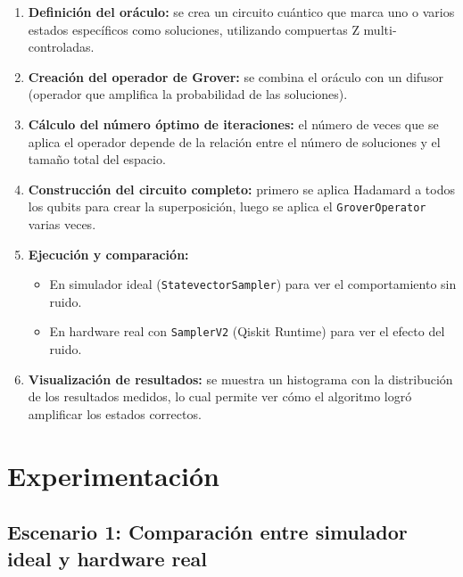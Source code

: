\documentclass{article}
\begin{document}
\begin{enumerate}
    \item \textbf{Definición del oráculo:} se crea un circuito cuántico que marca uno o 
    varios estados específicos como soluciones, utilizando compuertas Z multi-controladas.

    \item \textbf{Creación del operador de Grover:} se combina el oráculo con un difusor 
    (operador que amplifica la probabilidad de las soluciones).

    \item \textbf{Cálculo del número óptimo de iteraciones:} el número de veces que se aplica 
    el operador depende de la relación entre el número de soluciones y el tamaño total del espacio.

    \item \textbf{Construcción del circuito completo:} primero se aplica Hadamard a todos los 
    qubits para crear la superposición, luego se aplica el \texttt{GroverOperator} varias veces.

    \item \textbf{Ejecución y comparación:}
    \begin{itemize}
        \item En simulador ideal (\texttt{StatevectorSampler}) para ver el comportamiento sin ruido.
        \item En hardware real con \texttt{SamplerV2} (Qiskit Runtime) para ver el efecto del ruido.
    \end{itemize}

    \item \textbf{Visualización de resultados:} se muestra un histograma con la distribución de 
    los resultados medidos, lo cual permite ver cómo el algoritmo logró amplificar los estados 
    correctos.
\end{enumerate}



\section{Experimentación}\label{sec:exp}

\subsection{Escenario 1: Comparación entre simulador ideal y hardware real}
\end{document}
